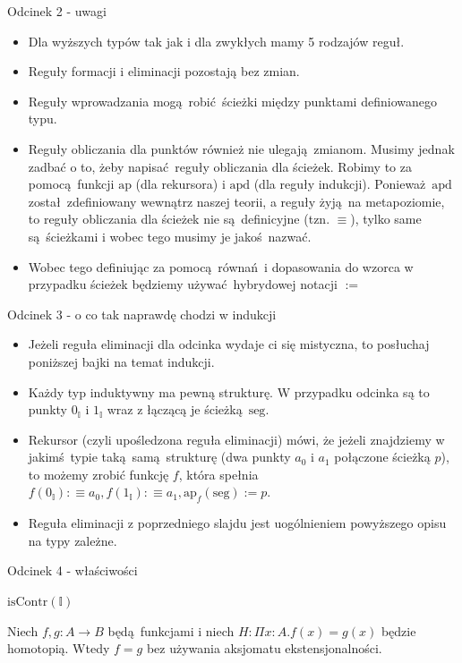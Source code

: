\documentclass{beamer}
\newcommand{\defn}{:\equiv}
\newcommand{\ap}[2]{\text{ap}_{#1}(#2)}
\newcommand{\isContr}{\text{isContr}}
\newcommand{\I}{\mathbb{I}}
\newcommand{\IZ}{0_\mathbb{I}}
\newcommand{\II}{1_\mathbb{I}}
\newcommand{\seg}{\text{seg}}
\begin{document}
\begin{frame}{Odcinek 2 - uwagi}
\begin{itemize}
	\item Dla wyższych typów tak jak i dla zwykłych mamy 5 rodzajów reguł.
	\item Reguły formacji i eliminacji pozostają bez zmian.
	\item Reguły wprowadzania mogą robić ścieżki między punktami definiowanego typu.
	\item Reguły obliczania dla punktów również nie ulegają zmianom. Musimy jednak zadbać o to, żeby napisać reguły obliczania dla ścieżek. Robimy to za pomocą funkcji $\text{ap}$ (dla rekursora) i $\text{apd}$ (dla reguły indukcji). Ponieważ $\text{apd}$ został zdefiniowany wewnątrz naszej teorii, a reguły żyją na metapoziomie, to reguły obliczania dla ścieżek nie są definicyjne (tzn. $\equiv$), tylko same są ścieżkami i wobec tego musimy je jakoś nazwać.
	\item Wobec tego definiując za pomocą równań i dopasowania do wzorca w przypadku ścieżek będziemy używać hybrydowej notacji $:=$
\end{itemize}
\end{frame}

\begin{frame}{Odcinek 3 - o co tak naprawdę chodzi w indukcji}
\begin{itemize}
	\item Jeżeli reguła eliminacji dla odcinka wydaje ci się mistyczna, to posłuchaj poniższej bajki na temat indukcji.
	\item Każdy typ induktywny ma pewną strukturę. W przypadku odcinka są to punkty $\IZ$ i $\II$ wraz z łączącą je ścieżką $\seg$.
	\item Rekursor (czyli upośledzona reguła eliminacji) mówi, że jeżeli znajdziemy w jakimś typie taką samą strukturę (dwa punkty $a_0$ i $a_1$ połączone ścieżką $p$), to możemy zrobić funkcję $f$, która spełnia $f(\IZ) \defn a_0, f(\II) \defn a_1, \ap{f}{\seg} := p$.
	\item Reguła eliminacji z poprzedniego slajdu jest uogólnieniem powyższego opisu na typy zależne.
\end{itemize}
\end{frame}

\begin{frame}{Odcinek 4 - właściwości}
	
\begin{theorem}
$\isContr(\I)$
\end{theorem}

\begin{theorem}
Niech $f, g : A \to B$ będą funkcjami i niech $H : \Pi x : A. f(x) = g(x)$ będzie homotopią. Wtedy $f = g$ bez używania aksjomatu ekstensjonalności.
\end{theorem}

\end{frame}
\end{document}

